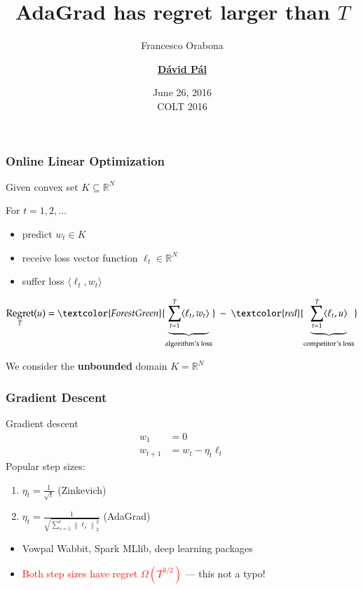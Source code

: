 \documentclass[usenames,dvipsnames]{beamer}
\title{AdaGrad has regret larger than $T$}
\date{June 26, 2016 \\ \tiny COLT 2016}
\author{Francesco Orabona \and \underline{\textbf{D\'avid P\'al}}}
\institute{Yahoo Research, New York}
\DeclareMathOperator{\Regret}{Regret}
\newcommand{\R}{\mathbb{R}}
\newcommand{\norm}[1]{\left\|#1\right\|}
\begin{document}
\begin{frame}
\maketitle
\end{frame}

\begin{frame}
\frametitle{Online Linear Optimization}

Given convex set $K \subseteq \R^N$

\vspace{0.3cm}

For $t=1,2,\dots$
\begin{itemize}
\item predict $w_t \in K$
\item receive loss vector function $\ell_t \in \R^N$
\item suffer loss $\langle \ell_t, w_t \rangle$
\end{itemize}

\vspace{0.3cm}
$$
\Regret_T(u) = \textcolor{ForestGreen}{\underbrace{\sum_{t=1}^T \langle \ell_t, w_t \rangle}_{\text{algorithm's loss}}} \ - \ \textcolor{red}{\underbrace{\sum_{t=1}^T \langle \ell_t, u \rangle}_{\text{competitor's loss}}}
$$

\vspace{0.3cm}

We consider the \textbf{unbounded} domain $K = \R^N$
\end{frame}

\begin{frame}
\frametitle{Gradient Descent}

Gradient descent
\begin{align*}
w_1 & = 0 \\
w_{t+1} & = w_t - \eta_t \ell_t
\end{align*}
Popular step sizes:
\begin{enumerate}
\item $\eta_t = \frac{1}{\sqrt{t}}$ \qquad \qquad \qquad (Zinkevich)
\item $\eta_t = \frac{1}{\sqrt{\sum_{s=1}^t \norm{\ell_s}_2^2}}$ \quad \qquad (AdaGrad)
\end{enumerate}

\vspace{1cm}

\begin{itemize}
\item Vowpal Wabbit, Spark MLlib, deep learning packages
\item \textcolor{red}{Both step sizes have regret $\Omega(T^{3/2})$} --- this not a typo!
\end{itemize}
\end{frame}
\end{document}

